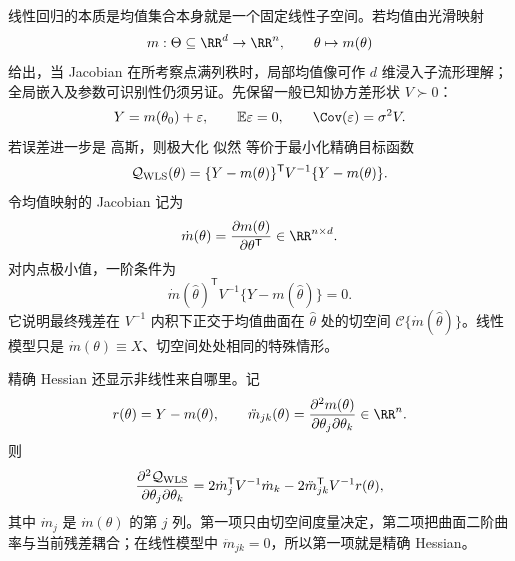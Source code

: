 \begin{definition}[非线性均值模型与加权目标]
线性回归的本质是均值集合本身就是一个固定线性子空间。若均值由光滑映射
\[
 m:\Theta\subseteq\RR^d\to\RR^n,
 \qquad
 \theta\mapsto m(\theta)
\]
给出，当 Jacobian 在所考察点满列秩时，局部均值像可作 $d$ 维浸入子流形理解；全局嵌入及参数可识别性仍须另证。先保留一般已知协方差形状 $V\succ0$：
\begin{equation*}Y=m(\theta_0)+\varepsilon,
 \qquad
 \mathbb E\varepsilon=0,
 \qquad
 \Cov(\varepsilon)=\sigma^2V.
\end{equation*}
若误差进一步是 高斯，则极大化 似然 等价于最小化精确目标函数
\begin{equation}\label{eq:math-stat-nonlinear-wls-objective}
 \mathcal Q_{\rm WLS}(\theta)
 =\{Y-m(\theta)\}^{\mathsf T}
 V^{-1}\{Y-m(\theta)\}.
\end{equation}
令均值映射的 Jacobian 记为
\[
 \dot m(\theta)
 =\frac{\partial m(\theta)}{\partial\theta^{\mathsf T}}
 \in\RR^{n\times d}.
\]
对内点极小值，一阶条件为
\begin{equation*}\dot m(\widehat\theta)^{\mathsf T}V^{-1}
 \{Y-m(\widehat\theta)\}=0.
\end{equation*}
它说明最终残差在 $V^{-1}$ 内积下正交于均值曲面在 $\widehat\theta$ 处的切空间 $\mathcal C\{\dot m(\widehat\theta)\}$。线性模型只是 $\dot m(\theta)\equiv X$、切空间处处相同的特殊情形。
\end{definition}

\begin{proposition}
精确 Hessian 还显示非线性来自哪里。记
\[
 r(\theta)=Y-m(\theta),
 \qquad
 \ddot m_{jk}(\theta)
 =\frac{\partial^2m(\theta)}
 {\partial\theta_j\partial\theta_k}
 \in\RR^n.
\]
则
\begin{equation}\label{eq:math-stat-nonlinear-exact-hessian}
 \frac{\partial^2\mathcal Q_{\rm WLS}}{\partial\theta_j\partial\theta_k}
 =2\dot m_j^{\mathsf T}V^{-1}\dot m_k
 -2\ddot m_{jk}^{\mathsf T}V^{-1}r(\theta),
\end{equation}
其中 $\dot m_j$ 是 $\dot m(\theta)$ 的第 $j$ 列。第一项只由切空间度量决定，第二项把曲面二阶曲率与当前残差耦合；在线性模型中 $\ddot m_{jk}=0$，所以第一项就是精确 Hessian。
\end{proposition}

